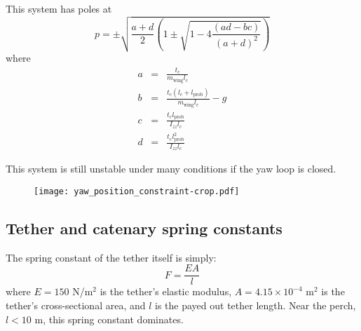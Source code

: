 \documentclass[11pt]{amsart}
\begin{document}
\begin{figure}[h]
\end{figure}

This system has poles at
\begin{equation}
p = \pm \sqrt{\frac{a+d}{2}
\left(1 \pm \sqrt{1 - 4 \frac{(ad - bc)}{(a + d)^2}}\right)}
\end{equation}
where
\begin{eqnarray}
a &=& \frac{t_c}{m_{\mathrm{wing}} l_c} \\
b &=& \frac{t_c (l_c + l_{\mathrm{prob}})}{m_{\mathrm{wing}} l_c} - g \\
c &=& \frac{t_c l_{\mathrm{prob}}}{I_{zz} l_c} \\
d &=& \frac{t_c l_{\mathrm{prob}}^2}{I_{zz} l_c}
\end{eqnarray}

This system is still unstable under many conditions if the yaw loop is
closed.

\begin{figure}[h]
\texttt{[image: yaw\_position\_constraint-crop.pdf]}
\end{figure}


\subsection{Tether and catenary spring constants}

The spring constant of the tether itself is simply:
\begin{equation}
F = \frac{E A}{l}
\end{equation}
where $E = 150$ N/m$^2$ is the tether's elastic modulus, $A = 4.15 \times 10^{-4}$
m$^2$ is the tether's cross-sectional area, and $l$ is the payed out
tether length.  Near the perch, $l < 10$ m, this spring constant
dominates.
\end{document}
